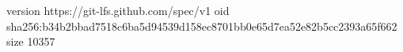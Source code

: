 version https://git-lfs.github.com/spec/v1
oid sha256:b34b2bbad7518c6ba5d94539d158ec8701bb0e65d7ea52e82b5cc2393a65f662
size 10357
